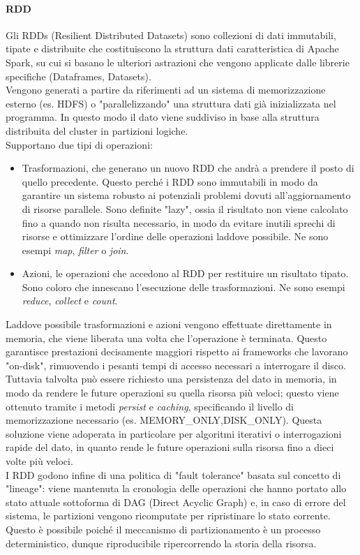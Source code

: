 \paragraph{RDD} Gli RDDs (Resilient Distributed Datasets) sono collezioni di dati immutabili, tipate e distribuite che costituiscono la struttura dati caratteristica di Apache Spark, su cui si basano le ulteriori astrazioni che vengono applicate dalle librerie specifiche (Dataframes, Datasets).\\
Vengono generati a partire da riferimenti ad un sistema di memorizzazione esterno (es. HDFS) o "parallelizzando" una struttura dati già inizializzata nel programma. In questo modo il dato viene suddiviso in base alla struttura distribuita del cluster in partizioni logiche.\\
Supportano due tipi di operazioni: 
\begin{itemize}
	\item Trasformazioni, che generano un nuovo RDD che andrà a prendere il posto di quello precedente. Questo perché i RDD sono immutabili in modo da garantire un sistema robusto ai potenziali problemi dovuti all'aggiornamento di risorse parallele. Sono definite "lazy", ossia il risultato non viene calcolato fino a quando non risulta necessario, in modo da evitare inutili sprechi di risorse e ottimizzare l'ordine delle operazioni laddove possibile. Ne sono esempi \textit{map}, \textit{filter} o \textit{join}.
	\item Azioni, le operazioni che accedono al RDD per restituire un risultato tipato. Sono coloro che innescano l'esecuzione delle trasformazioni. Ne sono esempi \textit{reduce}, \textit{collect} e \textit{count}. 
\end{itemize}
Laddove possibile trasformazioni e azioni vengono effettuate direttamente in memoria, che viene liberata una volta che l'operazione è terminata. Questo garantisce prestazioni decisamente maggiori rispetto ai frameworks che lavorano "on-disk", rimuovendo i pesanti tempi di accesso necessari a interrogare il disco. Tuttavia talvolta può essere richiesto una persistenza del dato in memoria, in modo da rendere le future operazioni su quella risorsa più veloci; questo viene ottenuto tramite i metodi \textit{persist} e \textit{caching}, specificando il livello di memorizzazione necessario (es. MEMORY\_ONLY,DISK\_ONLY). Questa soluzione viene adoperata in particolare per algoritmi iterativi o interrogazioni rapide del dato, in quanto rende le future operazioni sulla risorsa fino a dieci volte più veloci.\\
I RDD godono infine di una politica di "fault tolerance" basata sul concetto di "lineage": viene mantenuta la cronologia delle operazioni  che hanno portato allo stato attuale sottoforma di DAG (Direct Acyclic Graph) e, in caso di errore del sistema, le partizioni vengono ricomputate per ripristinare lo stato corrente. Questo è possibile poiché il meccanismo di partizionamento è un processo deterministico, dunque riproducibile ripercorrendo la storia della risorsa. \newline

